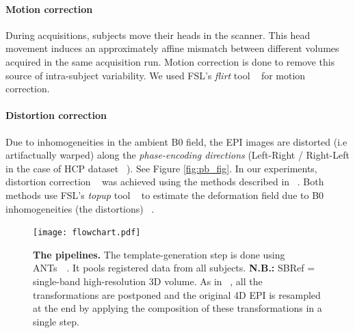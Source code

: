 \paragraph{Motion correction}
During acquisitions, subjects move their heads in the
scanner. This head movement induces an approximately affine mismatch
between different volumes acquired in the same acquisition
run. Motion correction is done to remove this source of intra-subject
variability.
We used FSL's \textit{flirt} tool ~\citep{smith2004} for motion correction.

\paragraph{Distortion correction}
\label{sec:dc}
Due to inhomogeneities in the ambient B0 field,
the EPI images are distorted (i.e artifactually warped) along the \textit{phase-encoding
  directions} (Left-Right / Right-Left in the case of HCP dataset
~\citep{VanEssen20122222}). See Figure \ref{fig:pb_fig}. In our
experiments, distortion correction ~\citep{pmid9178246,pmid12270226,zeng2002,anderson2003,jezzard1995correction,wan1997reduction} was
achieved using %
the methods described in ~\citep{VanEssen20122222}. %
Both methods use  FSL's \textit{topup} tool ~\citep{smith2004} to
estimate the deformation field due to B0 inhomogeneities (the
distortions) ~\citep{glasser2013}.

\begin{figure}[!htpb]
     \texttt{[image: flowchart.pdf]}
\caption{\textbf{The pipelines.} The template-generation step is done using ANTs~~\citep{avants2008,avants2011}. It pools registered data from all subjects. \textbf{N.B.:} SBRef = single-band high-resolution 3D volume. As in ~\citep{glasser2013}, all the transformations are postponed and the original 4D EPI is resampled at the end by applying the composition of these transformations in a single step.}
\label{fig:pipelines}
\end{figure}


